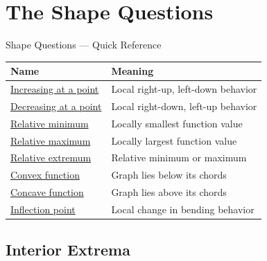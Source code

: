 \section{The Shape Questions}

\begin{toolkitbox}{Shape Questions --- Quick Reference}
\small
\begin{tabular}{l l}
\toprule
\textbf{Name} & \textbf{Meaning} \\
\midrule
\hyperref[def:increasing-at-a-point]{Increasing at a point} & Local right-up, left-down behavior \\
\hyperref[def:decreasing-at-a-point]{Decreasing at a point} & Local right-down, left-up behavior \\
\hyperref[def:relative-minimum]{Relative minimum} & Locally smallest function value \\
\hyperref[def:relative-maximum]{Relative maximum} & Locally largest function value \\
\hyperref[def:relative-extremum]{Relative extremum} & Relative minimum or maximum \\
\hyperref[def:convex-function]{Convex function} & Graph lies below its chords \\
\hyperref[def:concave-function]{Concave function} & Graph lies above its chords \\
\hyperref[def:inflection-point]{Inflection point} & Local change in bending behavior \\
\bottomrule
\end{tabular}
\end{toolkitbox}



\subsection{Interior Extrema}


